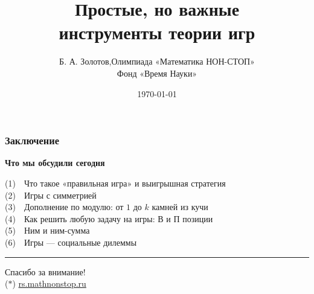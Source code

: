 \documentclass[aspectratio=1610,12pt,notheorems]{beamer}
\title[Introduction to Game Theory]
    {\bfseries Простые, но важные \\ инструменты теории игр}
\author[\ ]
	{Б. А. Золотов,\quad Олимпиада «Математика НОН-СТОП»\\ \vspace{0.3cm}
		{\small Фонд «Время Науки»}}
\institute[\ ]{\ }
\date{\today}
\begin{document}
\frame{\titlepage}









\def\fitem#1#2{\textcolor{hard}{\small (#1)}~~#2 \medskip \\}

\begin{frame} \frametitle{Заключение}

\textcolor{hard}{\bf Что мы обсудили сегодня}

\fitem{1}{Что такое «правильная игра» и выигрышная стратегия}
\fitem{2}{Игры с симметрией}
\fitem{3}{Дополнение по модулю: от $1$ до $k$ камней из кучи}
\fitem{4}{Как решить любую задачу на игры: В и П позиции}
\fitem{5}{Ним и ним-сумма}
\fitem{6}{Игры — социальные дилеммы \vspace{6mm}}

\hrule
\begin{center}
	{\LARGE Спасибо за внимание!} \smallskip \\
	{\footnotesize \textcolor{hard}{($*$)\quad}
		\url{rs.mathnonstop.ru}
		\phantom{($*$)\quad}}
\end{center} \vspace{2.4mm}
\end{frame}
\end{document}
